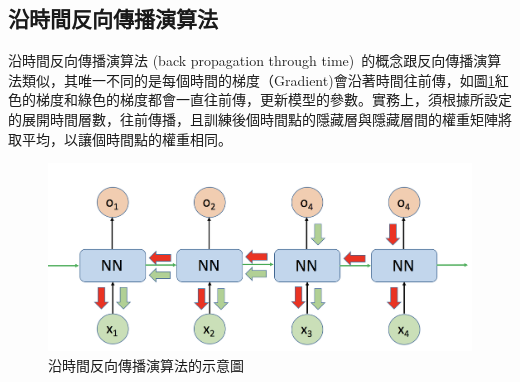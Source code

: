 \subsection{沿時間反向傳播演算法}
沿時間反向傳播演算法 (back propagation through time)~\cite{werbos1990backpropagation}的概念跟反向傳播演算法類似，其唯一不同的是每個時間的梯度（Gradient)會沿著時間往前傳，如圖\ref{fig:ch2_BPTT}紅色的梯度和綠色的梯度都會一直往前傳，更新模型的參數。實務上，須根據所設定的展開時間層數，往前傳播，且訓練後個時間點的隱藏層與隱藏層間的權重矩陣將取平均，以讓個時間點的權重相同。
\begin{figure}[ht]
\centering
\includegraphics[scale=0.5]{images/ch2_BPTT.png}
\caption{沿時間反向傳播演算法的示意圖} \label{fig:ch2_BPTT}
\end{figure}

